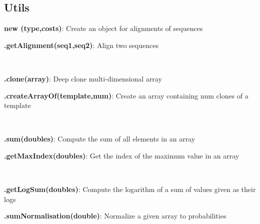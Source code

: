 \documentclass[10pt]{scrartcl}
\newcommand{\entry}[3]{{\bfseries #1#2}: #3}
\begin{document}
\begin{flushleft}
\section{Utils}

\entry{new \Alignment}{(type,costs)}{Create an object for alignments of sequences}

\entry{\Alignment}{.getAlignment(seq1,seq2)}{Align two sequences}

~

\entry{\ArrayHandler}{.clone(array)}{Deep clone multi-dimensional array}

\entry{\ArrayHandler}{.createArrayOf(template,num)}{Create an array containing num clones of a template}

~

\entry{\ToolBox}{.sum(doubles)}{Compute the sum of all elements in an array}

\entry{\ToolBox}{.getMaxIndex(doubles)}{Get the index of the maximum value in an array}

~

\entry{\Normalisation}{.getLogSum(doubles)}{Compute the logarithm of a sum of values given as their logs}

\entry{\Normalisation}{.sumNormalisation(double)}{Normalize a given array to probabilities}
\end{flushleft}
\end{document}
